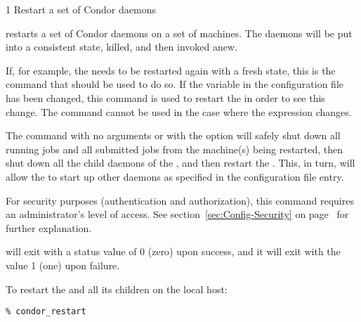 \begin{ManPage}{\label{man-condor-restart}}{1}
{Restart a set of Condor daemons}
\Synopsis {}
\ToolArgsBase

\ToolDebugOption
\ToolArgsLocate
\ToolArgsAffect

\ToolDebugOption
\ToolWhere
\ToolArgsAffect


\Description 

 restarts a set of Condor daemons on a set
of machines.
The daemons will be put into a consistent state,
killed, and then invoked anew.

If, for example, the  needs to be restarted again with
a fresh state, this is the command that should be used to do so.
If the  variable in the configuration file has
been changed, this command is used to restart the 
in order to see this change.
The  command cannot be used in the case where the
 expression changes.

The command
 with no arguments or with the 
 option
will safely shut down all running jobs and all submitted
jobs from the machine(s) being restarted, then shut down
all the child daemons of the ,
and then restart the .
This, in turn, will allow the  to start up
other daemons as specified in the  configuration
file entry.

For security purposes (authentication and authorization),
this command requires an administrator's level of access.
See
section~\ref{sec:Config-Security} on page~\pageref{sec:Config-Security}
for further explanation.

\begin{Options}
	\ToolArgsDesc
	\ToolDebugDesc
\end{Options}

\ExitStatus

 will exit with a status value of 0 (zero) upon success,
and it will exit with the value 1 (one) upon failure.

\Examples
To restart the  and all its children
on the local host:
\begin{verbatim}
% condor_restart
\end{verbatim}


\end{ManPage}
